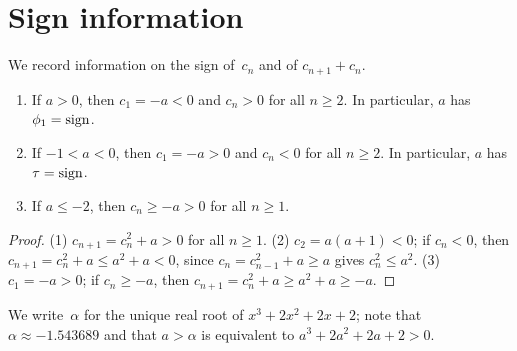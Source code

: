 \chapter{Sign information}
\label{chap:signs}

We record information on the sign of~$c_n$ and of $c_{n+1} + c_n$.

\begin{lemma}[Signs]
  \label{lem:signs}
  \leanok
  \begin{enumerate}
    \item If $a > 0$, then $c_1 = -a < 0$ and $c_n > 0$ for all $n \ge 2$. In particular, $a$ has
          $\phi_1 = \operatorname{sign}$.
    \item If $-1 < a < 0$, then $c_1 = -a > 0$ and $c_n < 0$ for all $n \ge 2$. In particular,
          $a$ has $\tau = \operatorname{sign}$.
    \item If $a \le -2$, then $c_n \ge -a > 0$ for all $n \ge 1$.
  \end{enumerate}
\end{lemma}
\begin{proof}
  \leanok
  (1) $c_{n+1} = c_n^2 + a > 0$ for all $n \ge 1$. (2) $c_2 = a(a + 1) < 0$; if $c_n < 0$, then
  $c_{n+1} = c_n^2 + a \le a^2 + a < 0$, since $c_n = c_{n-1}^2 + a \ge a$ gives $c_n^2 \le a^2$.
  (3) $c_1 = -a > 0$; if $c_n \ge -a$, then $c_{n+1} = c_n^2 + a \ge a^2 + a \ge -a$.
\end{proof}

\begin{definition}
  \label{def:alpha}
  \leanok
  We write~$\alpha$ for the unique real root of $x^3 + 2x^2 + 2x + 2$; note that
  $\alpha \approx -1.543689$ and that $a > \alpha$ is equivalent to $a^3 + 2a^2 + 2a + 2 > 0$.
\end{definition}

